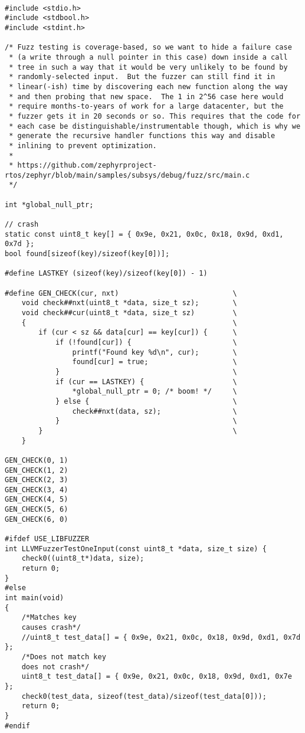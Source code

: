 \begin{verbatim}

#include <stdio.h>
#include <stdbool.h>
#include <stdint.h>

/* Fuzz testing is coverage-based, so we want to hide a failure case
 * (a write through a null pointer in this case) down inside a call
 * tree in such a way that it would be very unlikely to be found by
 * randomly-selected input.  But the fuzzer can still find it in
 * linear(-ish) time by discovering each new function along the way
 * and then probing that new space.  The 1 in 2^56 case here would
 * require months-to-years of work for a large datacenter, but the
 * fuzzer gets it in 20 seconds or so. This requires that the code for
 * each case be distinguishable/instrumentable though, which is why we
 * generate the recursive handler functions this way and disable
 * inlining to prevent optimization.
 *
 * https://github.com/zephyrproject-rtos/zephyr/blob/main/samples/subsys/debug/fuzz/src/main.c
 */

int *global_null_ptr;

// crash
static const uint8_t key[] = { 0x9e, 0x21, 0x0c, 0x18, 0x9d, 0xd1, 0x7d };
bool found[sizeof(key)/sizeof(key[0])];

#define LASTKEY (sizeof(key)/sizeof(key[0]) - 1)

#define GEN_CHECK(cur, nxt)                           \
    void check##nxt(uint8_t *data, size_t sz);        \
    void check##cur(uint8_t *data, size_t sz)         \
    {                                                 \
        if (cur < sz && data[cur] == key[cur]) {      \
            if (!found[cur]) {                        \
                printf("Found key %d\n", cur);        \
                found[cur] = true;                    \
            }                                         \
            if (cur == LASTKEY) {                     \
                *global_null_ptr = 0; /* boom! */     \
            } else {                                  \
                check##nxt(data, sz);                 \
            }                                         \
        }                                             \
    }

GEN_CHECK(0, 1)
GEN_CHECK(1, 2)
GEN_CHECK(2, 3)
GEN_CHECK(3, 4)
GEN_CHECK(4, 5)
GEN_CHECK(5, 6)
GEN_CHECK(6, 0)

#ifdef USE_LIBFUZZER
int LLVMFuzzerTestOneInput(const uint8_t *data, size_t size) {
    check0((uint8_t*)data, size);
    return 0;
}
#else
int main(void)
{
    /*Matches key
    causes crash*/
    //uint8_t test_data[] = { 0x9e, 0x21, 0x0c, 0x18, 0x9d, 0xd1, 0x7d };
    /*Does not match key
    does not crash*/
    uint8_t test_data[] = { 0x9e, 0x21, 0x0c, 0x18, 0x9d, 0xd1, 0x7e };
    check0(test_data, sizeof(test_data)/sizeof(test_data[0]));
    return 0;
}
#endif
\end{verbatim}
\label{lst:main_program_libfuzzer}

